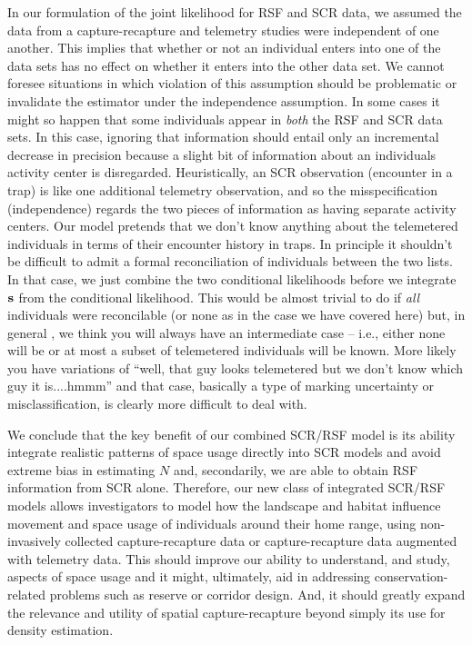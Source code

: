 \documentclass[12pt]{article}
\begin{document}
In our formulation of the joint likelihood for RSF and SCR data, we
assumed the data from a capture-recapture and telemetry studies were
independent of one another. This implies that whether or not an
individual enters into one of the data sets has no effect on whether
it enters into the other data set. We cannot foresee situations in
which violation of this assumption should be problematic or invalidate
the estimator under the independence assumption.  In some cases it
might so happen that some individuals appear in {\it both} the RSF and
SCR data sets. In this case, ignoring that information should entail
only an incremental decrease in precision because a slight bit of
information about an individuals activity center is
disregarded. Heuristically, an SCR observation (encounter in a trap)
is like one additional telemetry observation, and so the
misspecification (independence)
regards the
two pieces of information as having separate activity centers.
 Our model pretends that we don't know anything
about the telemetered individuals in terms of their encounter history
in traps.  In principle it shouldn't be difficult to admit a formal
reconciliation of individuals between the two lists. In that case, we
just combine the two conditional likelihoods before we integrate ${\bf
  s}$ from the conditional likelihood. This would be almost trivial to
do if {\it all} individuals were reconcilable (or none as in the case
we have covered here) but, in general , we think you will always have
an intermediate case -- i.e., either none will be or at most a subset
of telemetered individuals will be known. More likely you have variations of ``well, that
guy looks telemetered but we don't know which guy it is....hmmm'' and
that case, basically a type of marking uncertainty or
misclassification, is clearly more difficult to deal with.


We conclude that the key benefit of our combined SCR/RSF model is its
ability integrate realistic patterns of space usage directly into SCR
models and avoid extreme bias in estimating $N$ and, secondarily, we
are able to obtain RSF information from SCR alone.  Therefore, our new
class of integrated SCR/RSF models allows investigators to model how
the landscape and habitat influence movement and space usage of
individuals around their home range, using non-invasively collected
capture-recapture data or capture-recapture data augmented with
telemetry data.  This should improve our ability to understand, and
study, aspects of space usage and it might, ultimately, aid in
addressing conservation-related problems such as reserve or corridor
design. And, it should greatly expand the relevance and utility of
spatial capture-recapture beyond simply its use for density
estimation.
\end{document}
